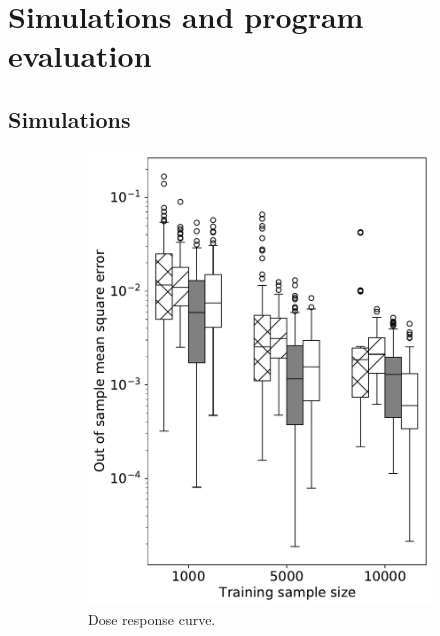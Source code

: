 \section{Simulations and program evaluation}\label{sec:experiments}

\subsection{Simulations}

\begin{figure}[ht]
\begin{centering}
     \begin{subfigure}[b]{0.48\textwidth}
         \centering
         \includegraphics[width=\textwidth]{img/colangelo_all2_sub_rep100_all_bma.pdf}
         \caption{Dose response curve.}
     \end{subfigure}
     \hfill
     \begin{subfigure}[b]{0.48\textwidth}

\end{subfigure}
\end{centering}
\end{figure}
